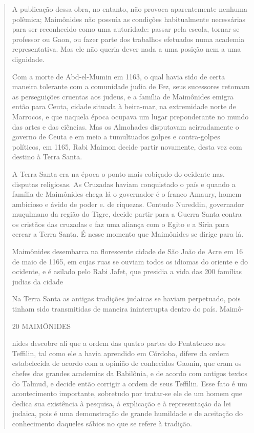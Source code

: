 \begin{quote}
A publicação dessa obra, no entanto, não provoca aparentemente nenhuma
polêmica; Maimônides não possuía as condições habitualmente ne­cessárias
para ser reconhecido como uma autoridade: passar pela escola, tornar-se
professor ou Gaon, ou fazer parte dos trabalhos efetuados numa academia
re­presentativa. Mas ele não queria dever nada a uma posição nem a uma
dignidade.

Com a morte de Abd-el-Mumin em 1163, o qual havia sido de certa maneira
tolerante com a comunidade judia de Fez, seus sucessores retomam as
perseguições cruentas aos judeus, e a família de Maimônides emigra então
para Ceuta, cidade situada à beira-mar, na extremidade norte de
Marrocos, e que naquela época ocupava um lugar preponderante no mundo
das artes e das ciências. Mas os Almohades disputavam acirradamente o
governo de Ceuta e em meio a tumultuados golpes e contra-golpes
políticos, em 1165, Rabi Mai­mon decide partir novamente, desta vez com
destino à Terra Santa.

A Terra Santa era na época o ponto mais cobiçado do ocidente nas.
disputas religiosas. As Cruzadas haviam conquistado o país e quando a
família de Maimônides chega lá o governador é o franco Amaury, homem
ambicioso e ávido de poder e. de riquezas. Contudo Nureddin, governador
muçulmano da região do Tigre, decide partir para a Guerra Santa contra
os cristãos das cru­zadas e faz uma aliança com o Egito e a Síria para
cercar a Terra Santa. É nesse momento que Maimônides se dirige para lá.

Maimônides desembarca na florescente cidade de São João de Acre em 16 de
maio de 1165, em cujas ruas se ouviam todos os idiomas do oriente e do
ocidente, e é asilado pelo Rabi Jafet, que presidia a vida das 200
famílias judias da cidade

Na Terra Santa as antigas tradições judaicas se haviam perpetuado, pois
tinham sido transmitidas de maneira ininterrupta dentro do país. Maimô-

20 MAIMÔNIDES

nides descobre ali que a ordem das quatro partes do Pentateuco nos
Teffilin, tal como ele a havia aprendido em Córdoba, difere da ordem
estabelecida de acordo com a opinião de conhecidos Gaonin, que eram os
chefes das grandes academias da Babilônia, e de acordo com antigos
textos do Talmud, e decide então corrigir a ordem de seus Teffilin. Esse
fato é um acontecimento impor­tante, sobretudo por tratar-se ele de um
homem que dedica sua existência à pesquisa, à explicação e à
representação da lei judaica, pois é uma demonstra­ção de grande
humildade e de aceitação do conhecimento daqueles sábios no que se
refere à tradição.


\end{quote}
